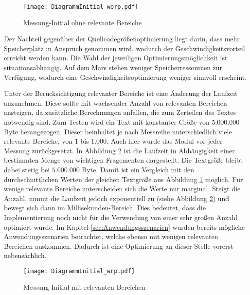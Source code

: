 \begin{figure}[H]
	\centering
	\texttt{[image: DiagrammInitial\_worp.pdf]}
	\label{fig:diagrammInitial_worp}
	\caption{Messung-Initial ohne relevante Bereiche}
\end{figure}

Der Nachteil gegenüber der Quellcodegrößenoptimierung liegt darin, dass
mehr Speicherplatz in Anspruch genommen wird, wodurch der
Geschwindigkeitsvorteil erreicht werden kann.
Die Wahl der jeweiligen Optimierungsmöglichkeit ist situationsabhängig. Auf dem
Mars stehen weniger Speicherressourcen zur Verfügung, wodurch eine
Geschwindigkeitsoptimierung weniger sinnvoll erscheint.

Unter der Berücksichtigung relevanter Bereiche ist eine Änderung der Laufzeit
anzunehmen. Diese sollte mit wachsender Anzahl von relevanten Bereichen
ansteigen, da zusätzliche Berechnungen anfallen, die zum Zerteilen des Textes
notwendig sind.
\newline
Zum Testen wird ein Text mit konstanter Größe von $5.000.000$ Byte
herangezogen. Dieser beinhaltet je nach Messreihe unterschiedlich viele
relevante Bereiche, von $1$ bis $1.000$. Auch hier wurde das Modul vor jeder
Messung zurückgesetzt.
\newline
In Abbildung \ref{fig:diagrammInitial_wrp} ist die Laufzeit in
Abhängigkeit einer bestimmten Menge von wichtigen Fragementen dargestellt.
Die Textgröße bleibt dabei stetig bei $5.000.000$ Byte. Damit ist ein Vergleich mit den
durchschnittlichen Werten der gleichen Textgröße aus Abbildung
\ref{fig:diagrammInitial_worp} möglich. Für wenige relevante Bereiche
unterscheiden sich die Werte nur marginal. Steigt die Anzahl, nimmt die Laufzeit
jedoch exponentiell zu (siehe Abbildung \ref{fig:diagrammInitial_wrp}) und
bewegt sich dann im Millisekunden-Bereich. Dies bedeutet, dass die Implementierung noch
nicht für die Verwendung von einer sehr großen Anzahl optimiert wurde. Im
Kapitel \ref{sec:Anwendungsszenarien} wurden bereits mögliche
Anwendungsszenarien betrachtet, welche ebenso mit wenigen relevanten Bereichen
auskommen. Dadurch ist eine Optimierung an dieser Stelle vorerst nebensächlich.

\begin{figure}[H]
	\centering
	\texttt{[image: DiagrammInitial\_wrp.pdf]}
	\label{fig:diagrammInitial_wrp}
	\caption{Messung-Initial mit relevanten Bereichen}
\end{figure}

